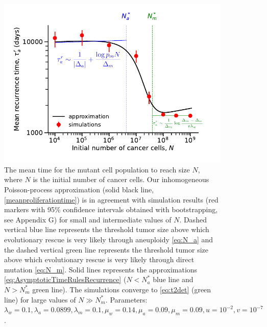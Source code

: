 \documentclass[12pt]{extarticle}
\begin{document}
\begin{figure}
\vspace*{1\baselineskip}
\includegraphics[width=1\textwidth]{Figures/ProliferationTimeLarge.pdf}
\caption{The mean time for the mutant cell population to reach size $N$, where $N$ is the initial number of cancer cells.
Our inhomogeneous Poisson-process approximation (solid black line, \cref{meanproliferationtime}) is in agreement with simulation results (red markers with 95\% confidence intervals obtained with bootstrapping, see Appendix G) for small and intermediate values of $N$. Dashed vertical blue line represents the threshold tumor size above which evolutionary rescue is very likely through aneuploidy \cref{eq:N_a} and the dashed vertical green line represents the threshold tumor size above which evolutionary rescue is very likely through direct mutation \cref{eq:N_m}. Solid lines represents the approximations \cref{eq:AsymptoticTimeRulesRecurrence} ($N<N_a^*$ blue line and $N>N_m^*$ green line). The simulations converge to \cref{eq:t2det} (green line) for large values of $N\gg N_m^*$.  Parameters: $\lambda_w=0.1,\lambda_a=0.0899,\lambda_m=0.1,\mu_w=0.14,\mu_a=0.09,\mu_m=0.09, u=10^{-2}, v=10^{-7}$.}
\label{ProliferationTimeLarge}
\end{figure}
\end{document}
